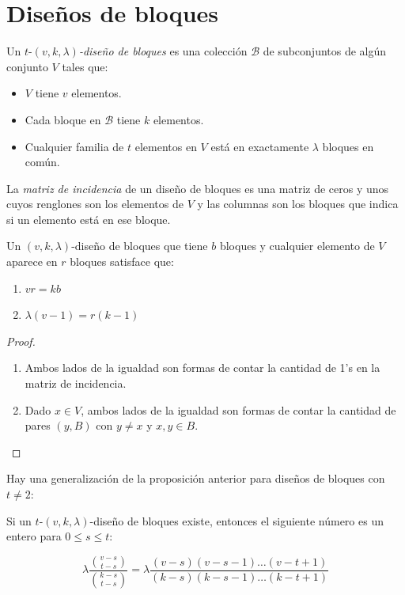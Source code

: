 \section{Diseños de bloques}
\label{section-disenos-de-bloques}
\begin{definition}
\label{definition-combi-024}
Un $t$-$(v,k,\lambda)$\emph{-diseño de
bloques} es una colección $\mathcal{B}$ de
subconjuntos de algún conjunto $V$ tales que:
\begin{itemize}
\item $V$ tiene $v$ elementos.
\item Cada bloque en $\mathcal{B}$ tiene $k$
elementos.
\item Cualquier familia de $t$ elementos en
$V$ está en exactamente $\lambda$ bloques en
común.
\end{itemize}
\end{definition}
\begin{definition}
\label{definition-combi-025}
La \emph{matriz de incidencia} de un diseño
de bloques es una matriz de ceros y unos
cuyos renglones son los elementos de $V$ y
las columnas son los bloques que indica si un
elemento está en ese bloque.
\end{definition}
\begin{proposition}
\label{proposition-combi-002}
Un $(v,k,\lambda)$-diseño de bloques que
tiene $b$ bloques y cualquier elemento de $V$
aparece en $r$ bloques satisface que:
\begin{enumerate}
\item $vr=kb$
\item $\lambda(v-1)=r(k-1)$
\end{enumerate}
\end{proposition}
\begin{proof}\leavevmode
\begin{enumerate}
\item Ambos lados de la igualdad son formas
de contar la cantidad de 1's en la matriz de
incidencia.
\item Dado $x\in V$, ambos lados de la
igualdad son formas de contar la cantidad de
pares $(y,B)$ con $y\neq x$ y $x,y\in B$.
\end{enumerate}
\end{proof}
Hay una generalización de la proposición
anterior para diseños de bloques con
$t\neq2$:
\begin{proposition}
\label{proposition-combi-003}
Si un $t$-$(v,k,\lambda)$-diseño de bloques
existe, entonces el siguiente número es un
entero para $0\leq s\leq t$:

$$
\lambda \frac{{v-s \choose t-s}}{{k-s \choose
t-s}} = \lambda \frac{(v-s)(v-s-1) \ldots(v-t
+ 1)}{(k-s)(k-s-1) \ldots(k-t + 1)}
$$

\end{proposition}
